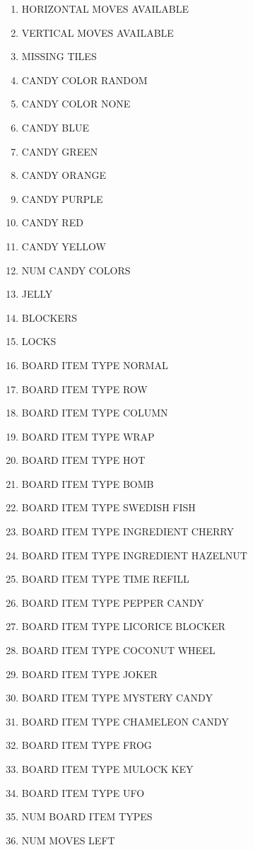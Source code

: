 \documentclass{kththesis}
\begin{document}
\begin{enumerate}
\label{tab:feature_planes}
\item HORIZONTAL MOVES AVAILABLE
\item VERTICAL MOVES AVAILABLE
\item MISSING TILES
\item CANDY COLOR RANDOM
\item CANDY COLOR NONE
\item CANDY BLUE
\item CANDY GREEN
\item CANDY ORANGE
\item CANDY PURPLE
\item CANDY RED
\item CANDY YELLOW
\item NUM CANDY COLORS
\item JELLY
\item BLOCKERS
\item LOCKS
\item BOARD ITEM TYPE NORMAL
\item BOARD ITEM TYPE ROW
\item BOARD ITEM TYPE COLUMN
\item BOARD ITEM TYPE WRAP
\item BOARD ITEM TYPE HOT
\item BOARD ITEM TYPE BOMB
\item BOARD ITEM TYPE SWEDISH FISH
\item BOARD ITEM TYPE INGREDIENT CHERRY
\item BOARD ITEM TYPE INGREDIENT HAZELNUT
\item BOARD ITEM TYPE TIME REFILL
\item BOARD ITEM TYPE PEPPER CANDY
\item BOARD ITEM TYPE LICORICE BLOCKER
\item BOARD ITEM TYPE COCONUT WHEEL
\item BOARD ITEM TYPE JOKER
\item BOARD ITEM TYPE MYSTERY CANDY
\item BOARD ITEM TYPE CHAMELEON CANDY
\item BOARD ITEM TYPE FROG
\item BOARD ITEM TYPE MULOCK KEY
\item BOARD ITEM TYPE UFO
\item NUM BOARD ITEM TYPES
\item NUM MOVES LEFT
\end{enumerate}
\end{document}
